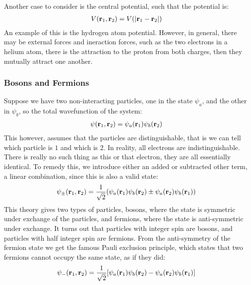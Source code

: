 Another case to consider is the central potential, such that the potential is:
\begin{align*}
  V(\vb{r}_1,\vb{r}_2)=V(\abs{\vb{r}_1-\vb{r}_2})
\end{align*}
An example of this is the hydrogen atom potential. However, in general, there may be external forces and ineraction forces, such as the two electrons in a helium atom, there is the attraction to the proton from both charges, then they mutually attract one another. 
\subsubsection{Bosons and Fermions}
Suppose we have two non-interacting particles, one in the state $\psi_a$, and the other in $\psi_b$, so the total wavefunction of the system:
\begin{align*}
  \psi(\vb{r}_1,\vb{r}_2)=\psi_a(\vb{r}_1)\psi_b(\vb{r}_2)
\end{align*}
This however, assumes that the particles are distinguishable, that is we can tell which particle is $1$ and which is $2$. In reality, all electrons are indistinguishable. There is really no such thing as this or that electron, they are all essentially identical. To remedy this, we introduce either an added or subtracted other term, a linear combination, since this is also a valid state:
\begin{align*}
  \psi_\pm(\vb{r}_1,\vb{r}_2)=\dfrac{1}{\sqrt{2}}
  \qty(\psi_a(\vb{r}_1)\psi_b(\vb{r}_2)\pm\psi_a(\vb{r}_2)\psi_b(\vb{r}_1))
\end{align*}
This theory gives two types of particles, bosons, where the state is symmetric under exchange of the particles, and fermions, where the state is anti-symmetric under exchange. It turns out that particles with integer spin are bosons, and particles with half integer spin are fermions. From the anti-symmetry of the fermion state we get the famous Pauli exclusion principle, which states that two fermions cannot occupy the same state, as if they did:
\begin{align*}
  \psi_-(\vb{r}_1,\vb{r}_2)=\dfrac{1}{\sqrt{2}}\qty
      [\psi_a(\vb{r}_1)\psi_b(\vb{r}_2)-\psi_a(\vb{r}_2)\psi_b(\vb{r}_1)]
\end{align*}
